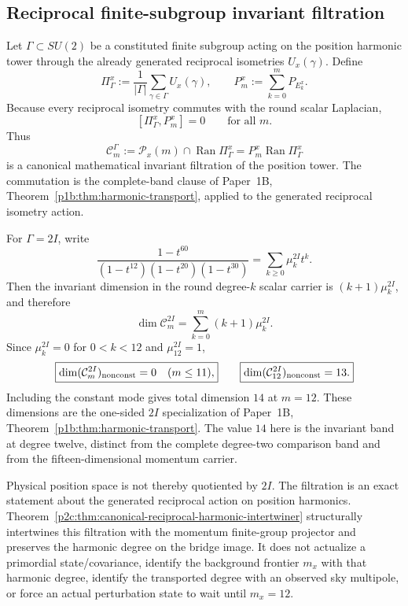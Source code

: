 \documentclass[12pt,a4paper]{article}
\begin{document}
\subsection{Reciprocal finite-subgroup invariant filtration}
\label{p2c:app:v191-finite-subgroup-invariant-filtration}

\begin{proposition}
\label{p2c:prop:v191-finite-subgroup-band-commutation}
Let $\Gamma\subset SU(2)$ be a constituted finite subgroup acting on the
position harmonic tower through the already generated reciprocal isometries
$U_x(\gamma)$.  Define
\[
 \Pi_\Gamma^x:=\frac1{|\Gamma|}\sum_{\gamma\in\Gamma}U_x(\gamma),
 \qquad
 P_m^x:=\sum_{k=0}^mP_{E_k^x}.
\]
Because every reciprocal isometry commutes with the round scalar Laplacian,
\[
 \boxed{[\Pi_\Gamma^x,P_m^x]=0\qquad\text{for all }m.}
\]
Thus
\[
 \mathcal C_m^\Gamma
 :=\mathcal P_x(m)\cap\operatorname{Ran}\Pi_\Gamma^x
 =P_m^x\operatorname{Ran}\Pi_\Gamma^x
\]
is a canonical mathematical invariant filtration of the position tower.
The commutation is the complete-band clause of Paper~1B,
Theorem~\ref{p1b:thm:harmonic-transport}, applied to the generated
reciprocal isometry action.
\end{proposition}

\begin{corollary}
\label{p2c:cor:v191-2i-position-rank-jump}
For $\Gamma=2I$, write
\[
 \frac{1-t^{60}}{(1-t^{12})(1-t^{20})(1-t^{30})}
 =\sum_{k\ge0}\mu_k^{2I}t^k.
\]
Then the invariant dimension in the round degree-$k$ scalar carrier is
$(k+1)\mu_k^{2I}$, and therefore
\[
 \dim\mathcal C_m^{2I}=\sum_{k=0}^m(k+1)\mu_k^{2I}.
\]
Since $\mu_k^{2I}=0$ for $0<k<12$ and $\mu_{12}^{2I}=1$,
\[
 \boxed{\dim(\mathcal C_m^{2I})_{\rm nonconst}=0\quad(m\le11),}
 \qquad
 \boxed{\dim(\mathcal C_{12}^{2I})_{\rm nonconst}=13.}
\]
Including the constant mode gives total dimension $14$ at $m=12$.
These dimensions are the one-sided $2I$ specialization of Paper~1B,
Theorem~\ref{p1b:thm:harmonic-transport}. The value $14$ here is the
invariant band at degree twelve, distinct from the complete degree-two
comparison band and from the fifteen-dimensional momentum carrier.
\end{corollary}

\begin{remark}
Physical position space is not thereby quotiented by $2I$.  The filtration is
an exact statement about the generated reciprocal action on position
harmonics.  Theorem~\ref{p2c:thm:canonical-reciprocal-harmonic-intertwiner}
structurally intertwines this filtration with the momentum finite-group
projector and preserves the harmonic degree on the bridge image.  It does not
actualize a primordial state/covariance, identify the background frontier
$m_x$ with that harmonic degree, identify the transported degree with an
observed sky multipole, or force an actual perturbation state to wait until
$m_x=12$.
\end{remark}
\end{document}
